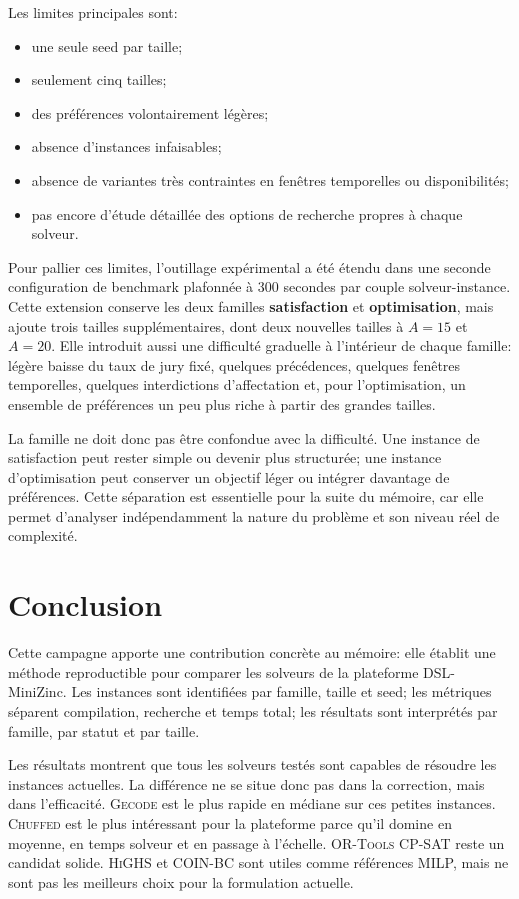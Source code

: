 \documentclass[12pt,a4paper]{article}
\newcommand{\solver}[1]{\textnormal{\textsc{#1}}}
\newcommand{\mzn}{MiniZinc}
\newcommand{\dsl}{\textnormal{\textsc{DSL}}}
\begin{document}
Les limites principales sont:

\begin{itemize}
  \item une seule seed par taille;
  \item seulement cinq tailles;
  \item des préférences volontairement légères;
  \item absence d'instances infaisables;
  \item absence de variantes très contraintes en fenêtres temporelles ou disponibilités;
  \item pas encore d'étude détaillée des options de recherche propres à chaque solveur.
\end{itemize}

Pour pallier ces limites, l'outillage expérimental a été étendu dans une seconde configuration de benchmark plafonnée à 300 secondes par couple solveur-instance. Cette extension conserve les deux familles \textbf{satisfaction} et \textbf{optimisation}, mais ajoute trois tailles supplémentaires, dont deux nouvelles tailles à \mbox{$A=15$} et \mbox{$A=20$}. Elle introduit aussi une difficulté graduelle à l'intérieur de chaque famille: légère baisse du taux de jury fixé, quelques précédences, quelques fenêtres temporelles, quelques interdictions d'affectation et, pour l'optimisation, un ensemble de préférences un peu plus riche à partir des grandes tailles.

La famille ne doit donc pas être confondue avec la difficulté. Une instance de satisfaction peut rester simple ou devenir plus structurée; une instance d'optimisation peut conserver un objectif léger ou intégrer davantage de préférences. Cette séparation est essentielle pour la suite du mémoire, car elle permet d'analyser indépendamment la nature du problème et son niveau réel de complexité.

\section{Conclusion}

Cette campagne apporte une contribution concrète au mémoire: elle établit une méthode reproductible pour comparer les solveurs de la plateforme \dsl{}-\mzn{}. Les instances sont identifiées par famille, taille et seed; les métriques séparent compilation, recherche et temps total; les résultats sont interprétés par famille, par statut et par taille.

Les résultats montrent que tous les solveurs testés sont capables de résoudre les instances actuelles. La différence ne se situe donc pas dans la correction, mais dans l'efficacité. \solver{Gecode} est le plus rapide en médiane sur ces petites instances. \solver{Chuffed} est le plus intéressant pour la plateforme parce qu'il domine en moyenne, en temps solveur et en passage à l'échelle. \solver{OR-Tools CP-SAT} reste un candidat solide. \solver{HiGHS} et \solver{COIN-BC} sont utiles comme références MILP, mais ne sont pas les meilleurs choix pour la formulation actuelle.
\end{document}
